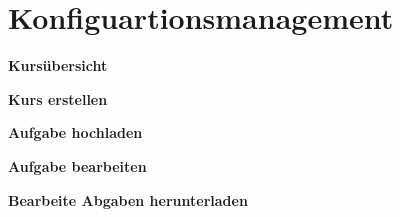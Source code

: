 
\chapter{Konfiguartionsmanagement}
\label{sec:chap2}

\textbf{Kursübersicht}

\textbf{Kurs erstellen}

\textbf{Aufgabe hochladen}

\textbf{Aufgabe bearbeiten}

\textbf{Bearbeite Abgaben herunterladen}